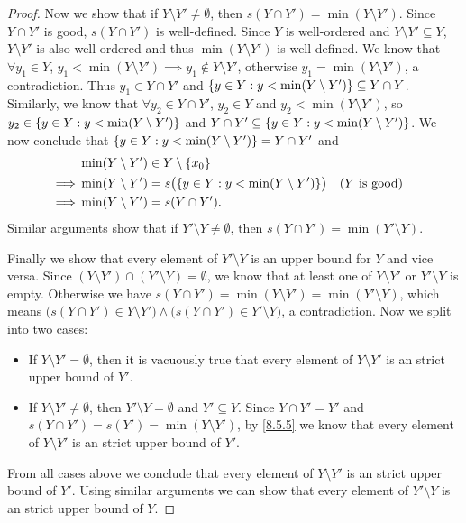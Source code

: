 \begin{proof}
  Now we show that if \(Y \setminus Y' \neq \emptyset\), then \(s(Y \cap Y') = \min(Y \setminus Y')\).
  Since \(Y \cap Y'\) is good, \(s(Y \cap Y')\) is well-defined.
  Since \(Y\) is well-ordered and \(Y \setminus Y' \subseteq Y\), \(Y \setminus Y'\) is also well-ordered and thus \(\min(Y \setminus Y')\) is well-defined.
  We know that \(\forall y_1 \in Y\), \(y_1 < \min(Y \setminus Y') \implies y_1 \notin Y \setminus Y'\), otherwise \(y_1 = \min(Y \setminus Y')\), a contradiction.
  Thus \(y_1 \in Y \cap Y'\) and \(\left\lbrace y \in Y : y < \min(Y \setminus Y')\right\rbrace \subseteq Y \cap Y\).
  Similarly, we know that \(\forall y_2 \in Y \cap Y'\), \(y_2 \in Y\) and \(y_2 < \min(Y \setminus Y')\), so \(y_2 \in \left\lbrace y \in Y : y < \min(Y \setminus Y')\right\rbrace\) and \(Y \cap Y' \subseteq \left\lbrace y \in Y : y < \min(Y \setminus Y')\right\rbrace\).
  We now conclude that \(\left\lbrace y \in Y : y < \min(Y \setminus Y')\right\rbrace = Y \cap Y'\) and
  \begin{align*}
             & \min(Y \setminus Y') \in Y \setminus \set{x_0}                                                         \\
    \implies & \min(Y \setminus Y') = s\big(\set{y \in Y : y < \min(Y \setminus Y')}\big) &  & \text{(\(Y\) is good)} \\
    \implies & \min(Y \setminus Y') = s(Y \cap Y').
  \end{align*}
  Similar arguments show that if \(Y' \setminus Y \neq \emptyset\), then \(s(Y \cap Y') = \min(Y' \setminus Y)\).

  Finally we show that every element of \(Y' \setminus Y\) is an upper bound for \(Y\) and vice versa.
  Since \((Y \setminus Y') \cap (Y' \setminus Y) = \emptyset\), we know that at least one of \(Y \setminus Y'\) or \(Y' \setminus Y\) is empty.
  Otherwise we have \(s(Y \cap Y') = \min(Y \setminus Y') = \min(Y' \setminus Y)\), which means \(\big(s(Y \cap Y') \in Y \setminus Y'\big) \land \big(s(Y \cap Y') \in Y' \setminus Y\big)\), a contradiction.
  Now we split into two cases:
  \begin{itemize}
    \item If \(Y \setminus Y' = \emptyset\), then it is vacuously true that every element of \(Y \setminus Y'\) is an strict upper bound of \(Y'\).
    \item If \(Y \setminus Y' \neq \emptyset\), then \(Y' \setminus Y = \emptyset\) and \(Y' \subseteq Y\).
          Since \(Y \cap Y' = Y'\) and \(s(Y \cap Y') = s(Y') = \min(Y \setminus Y')\), by \cref{8.5.5} we know that every element of \(Y \setminus Y'\) is an strict upper bound of \(Y'\).
  \end{itemize}
  From all cases above we conclude that every element of \(Y \setminus Y'\) is an strict upper bound of \(Y'\).
  Using similar arguments we can show that every element of \(Y' \setminus Y\) is an strict upper bound of \(Y\).
\end{proof}

